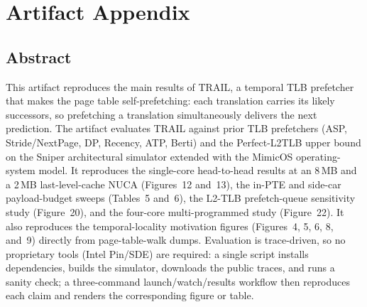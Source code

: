 %
%
%      
%
%

\appendix
\section{Artifact Appendix}

\subsection{Abstract}

This artifact reproduces the main results of TRAIL, a temporal TLB
prefetcher that makes the page table self-prefetching: each translation
carries its likely successors, so prefetching a translation simultaneously
delivers the next prediction. The artifact evaluates TRAIL against prior
TLB prefetchers (ASP, Stride/NextPage, DP, Recency, ATP, Berti) and the
Perfect-L2TLB upper bound on the Sniper architectural simulator extended
with the MimicOS operating-system model. It reproduces the single-core
head-to-head results at an 8\,MB and a 2\,MB last-level-cache NUCA
(Figures~12 and~13), the in-PTE and side-car payload-budget sweeps
(Tables~5 and~6), the L2-TLB prefetch-queue sensitivity study
(Figure~20), and the four-core multi-programmed study (Figure~22). It also
reproduces the temporal-locality motivation figures (Figures~4, 5, 6, 8,
and~9) directly from page-table-walk dumps. Evaluation is trace-driven, so
no proprietary tools (Intel Pin/SDE) are required: a single script installs
dependencies, builds the simulator, downloads the public traces, and runs a
sanity check; a three-command launch/watch/results workflow then reproduces
each claim and renders the corresponding figure or table.

